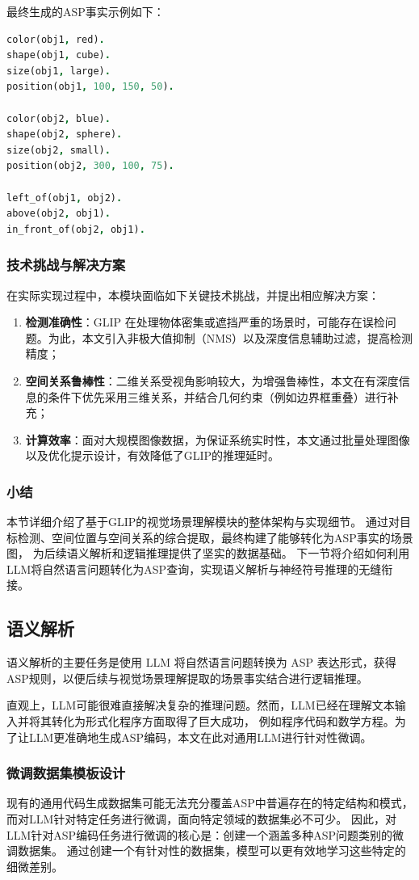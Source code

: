 最终生成的ASP事实示例如下： 
\begin{lstlisting}[language=Prolog] 
color(obj1, red). 
shape(obj1, cube). 
size(obj1, large). 
position(obj1, 100, 150, 50).

color(obj2, blue). 
shape(obj2, sphere). 
size(obj2, small). 
position(obj2, 300, 100, 75).

left_of(obj1, obj2). 
above(obj2, obj1). 
in_front_of(obj2, obj1). 
\end{lstlisting}
\subsubsection{技术挑战与解决方案}
在实际实现过程中，本模块面临如下关键技术挑战，并提出相应解决方案： 
\begin{enumerate}[nosep] 
    \item \textbf{检测准确性}：GLIP 在处理物体密集或遮挡严重的场景时，可能存在误检问题。为此，本文引入非极大值抑制（NMS）以及深度信息辅助过滤，提高检测精度； 
    \item \textbf{空间关系鲁棒性}：二维关系受视角影响较大，为增强鲁棒性，本文在有深度信息的条件下优先采用三维关系，并结合几何约束（例如边界框重叠）进行补充； 
    \item \textbf{计算效率}：面对大规模图像数据，为保证系统实时性，本文通过批量处理图像以及优化提示设计，有效降低了GLIP的推理延时。
\end{enumerate}
\subsubsection{小结}
本节详细介绍了基于GLIP的视觉场景理解模块的整体架构与实现细节。
通过对目标检测、空间位置与空间关系的综合提取，最终构建了能够转化为ASP事实的场景图，
为后续语义解析和逻辑推理提供了坚实的数据基础。
下一节将介绍如何利用LLM将自然语言问题转化为ASP查询，实现语义解析与神经符号推理的无缝衔接。
\subsection{语义解析}
语义解析的主要任务是使用 LLM 将自然语言问题转换为 ASP 表达形式，获得ASP规则，以便后续与视觉场景理解提取的场景事实结合进行逻辑推理。

直观上，LLM可能很难直接解决复杂的推理问题。然而，LLM已经在理解文本输入并将其转化为形式化程序方面取得了巨大成功，
例如程序代码\cite{gao2023pal}和数学方程\cite{he2023solving}。为了让LLM更准确地生成ASP编码，本文在此对通用LLM进行针对性微调。
\subsubsection{微调数据集模板设计}
现有的通用代码生成数据集可能无法充分覆盖ASP中普遍存在的特定结构和模式，而对LLM针对特定任务进行微调，面向特定领域的数据集必不可少。
因此，对LLM针对ASP编码任务进行微调的核心是：创建一个涵盖多种ASP问题类别的微调数据集。
通过创建一个有针对性的数据集，模型可以更有效地学习这些特定的细微差别。

